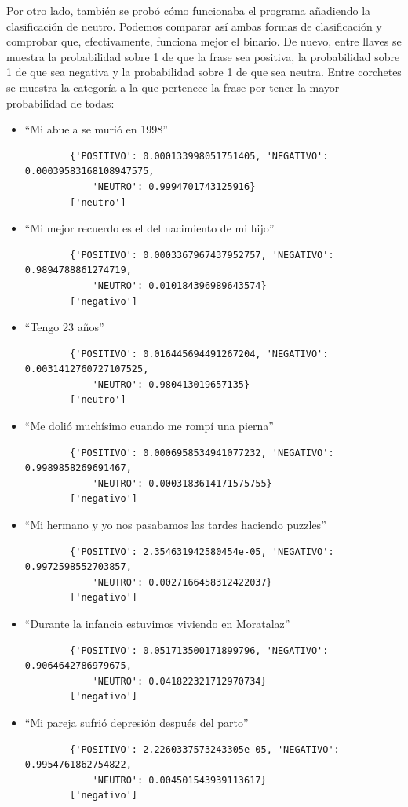 Por otro lado, también se probó cómo funcionaba el programa añadiendo la clasificación de neutro. Podemos comparar así ambas formas de clasificación y comprobar que, efectivamente, funciona mejor el binario. De nuevo, entre llaves se muestra la probabilidad sobre 1 de que la frase sea positiva, la probabilidad sobre 1 de que sea negativa y la probabilidad sobre 1 de que sea neutra. Entre corchetes se muestra la categoría a la que pertenece la frase por tener la mayor probabilidad de todas:

\begin{itemize}
	\item ``Mi abuela se murió en 1998''
	\begin{verbatim}
		{'POSITIVO': 0.000133998051751405, 'NEGATIVO': 0.00039583168108947575,
			'NEUTRO': 0.9994701743125916}
		['neutro']
	\end{verbatim}
	\item ``Mi mejor recuerdo es el del nacimiento de mi hijo''
	\begin{verbatim}
		{'POSITIVO': 0.0003367967437952757, 'NEGATIVO': 0.9894788861274719, 
			'NEUTRO': 0.010184396989643574}
		['negativo']
	\end{verbatim}
	\item ``Tengo 23 años''
	\begin{verbatim}
		{'POSITIVO': 0.016445694491267204, 'NEGATIVO': 0.0031412760727107525, 
			'NEUTRO': 0.980413019657135}
		['neutro']
	\end{verbatim}
	\item ``Me dolió muchísimo cuando me rompí una pierna''
	\begin{verbatim}
		{'POSITIVO': 0.0006958534941077232, 'NEGATIVO': 0.9989858269691467, 
			'NEUTRO': 0.0003183614171575755}
		['negativo']
	\end{verbatim}
	\item ``Mi hermano y yo nos pasabamos las tardes haciendo puzzles''
	\begin{verbatim}
		{'POSITIVO': 2.354631942580454e-05, 'NEGATIVO': 0.9972598552703857, 
			'NEUTRO': 0.0027166458312422037}
		['negativo']
	\end{verbatim}
	\item ``Durante la infancia estuvimos viviendo en Moratalaz''
	\begin{verbatim}
		{'POSITIVO': 0.051713500171899796, 'NEGATIVO': 0.9064642786979675, 
			'NEUTRO': 0.041822321712970734}
		['negativo']
	\end{verbatim}
	\item ``Mi pareja sufrió depresión después del parto''
	\begin{verbatim}
		{'POSITIVO': 2.2260337573243305e-05, 'NEGATIVO': 0.9954761862754822, 
			'NEUTRO': 0.004501543939113617}
		['negativo']
	\end{verbatim}
	
\end{itemize}


